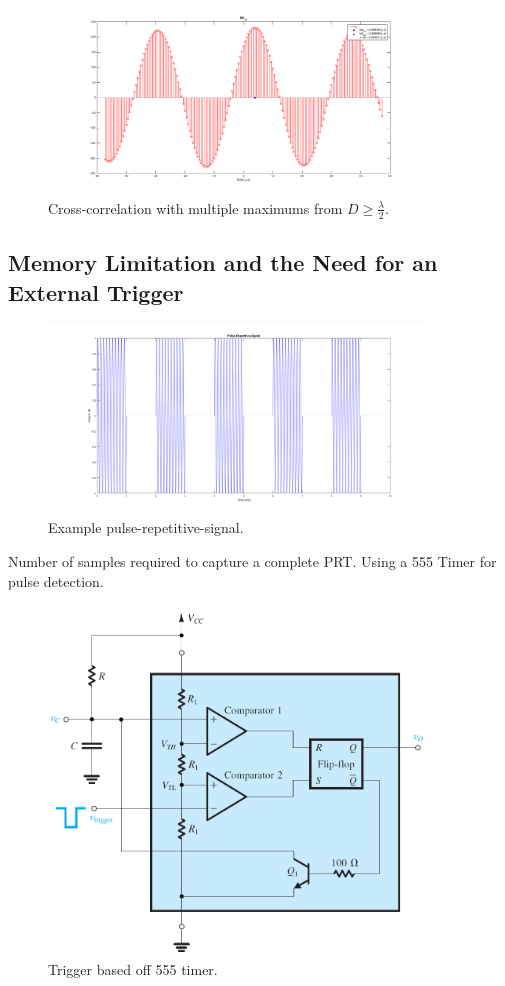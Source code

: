 \documentclass[12pt]{article}
\begin{document}
\pagebreak

\begin{figure}[!h]
	\centering
	\includegraphics[width=10.0cm]{Pics_and_Figs/XC_Full_Heads.png}
    \caption{Cross-correlation with multiple maximums from $D \geq \frac{\lambda}{2}$.} \label{fig:XC_Full_Heads}
\end{figure}

\subsection{Memory Limitation and the Need for an External Trigger}

\begin{figure}[!h]
	\centering
	\includegraphics[width=10.0cm]{Pics_and_Figs/Pulse_Repetitive_Signal.png}
    \caption{Example pulse-repetitive-signal.} \label{fig:Pulse_Repetitive_Signal}
\end{figure}

	Number of samples required to capture a complete PRT. 
    Using a 555 Timer for pulse detection.

\pagebreak

\begin{figure}[!h]
	\centering
	\includegraphics[width=10.0cm]{Pics_and_Figs/555_Timer.png}
    \caption{Trigger based off 555 timer.} \label{fig:555_Timer}
\end{figure}
\end{document}
